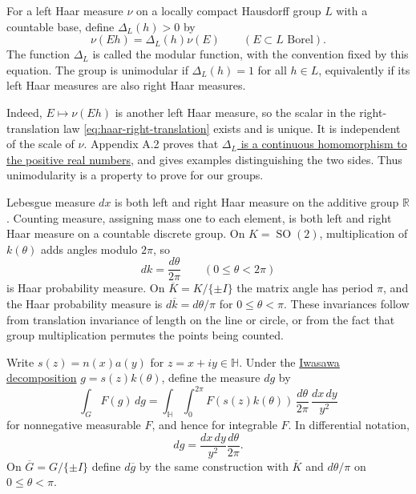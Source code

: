 \begin{definition}\label{measure.unimodular}
For a left Haar measure $\nu$ on a locally compact Hausdorff group $L$ with a countable base, define $\Delta_L(h)>0$ by
\begin{equation}\label{eq:haar-right-translation}
 \nu(Eh)=\Delta_L(h)\nu(E)
 \qquad(E\subset L\text{ Borel}).
\end{equation}
The function $\Delta_L$ is called the modular function, with the convention fixed by this equation. The group is unimodular if $\Delta_L(h)=1$ for all $h\in L$, equivalently if its left Haar measures are also right Haar measures.
\end{definition}

Indeed, $E\mapsto\nu(Eh)$ is another left Haar measure, so the scalar in the right-translation law \eqref{eq:haar-right-translation} exists and is unique. It is independent of the scale of $\nu$. Appendix A.2 proves that \hyperref[measure.haar-modular-function]{$\Delta_L$ is a continuous homomorphism to the positive real numbers}, and gives examples distinguishing the two sides. Thus unimodularity is a property to prove for our groups.

\begin{example}\label{measure.haar-examples}
Lebesgue measure $dx$ is both left and right Haar measure on the additive group $\mathbb R$. Counting measure, assigning mass one to each element, is both left and right Haar measure on a countable discrete group. On $K=\operatorname{SO}(2)$, multiplication of $k(\theta)$ adds angles modulo $2\pi$, so
\[
 dk=\frac{d\theta}{2\pi}\qquad(0\leq\theta<2\pi)
\]
is Haar probability measure. On $\overline K=K/\{\pm I\}$ the matrix angle has period $\pi$, and the Haar probability measure is $d\overline k=d\theta/\pi$ for $0\leq\theta<\pi$. These invariances follow from translation invariance of length on the line or circle, or from the fact that group multiplication permutes the points being counted.
\end{example}

\begin{definition}\label{modular.haar-normalizations}
Write $s(z)=n(x)a(y)$ for $z=x+iy\in\mathbb H$. Under the \hyperref[hyperbolic.iwasawa]{Iwasawa decomposition} $g=s(z)k(\theta)$, define the measure $dg$ by
\begin{equation}\label{eq:haar-iwasawa}
 \int_G F(g)\,dg
 =\int_{\mathbb H}\int_0^{2\pi}
 F(s(z)k(\theta))\,\frac{d\theta}{2\pi}\,\frac{dx\,dy}{y^2}
\end{equation}
for nonnegative measurable $F$, and hence for integrable $F$. In differential notation,
\[
 dg=\frac{dx\,dy}{y^2}\frac{d\theta}{2\pi}.
\]
On $\overline G=G/\{\pm I\}$ define $d\overline g$ by the same construction with $\overline K$ and $d\theta/\pi$ on $0\leq\theta<\pi$.
\end{definition}

